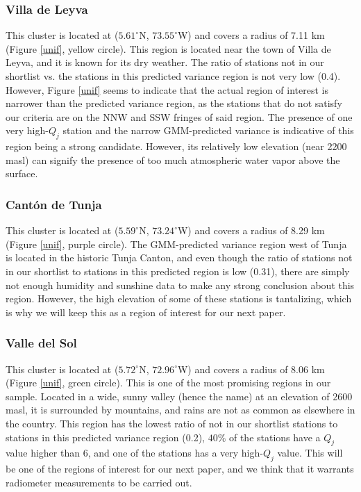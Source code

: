 \documentclass[12pt]{iopart}
\begin{document}
\subsubsection{Villa de Leyva}

This cluster is located at ($5.61^\circ$N, $73.55^\circ$W) and covers a radius of 7.11 km (Figure \ref{unif}, yellow circle). This region is located near the town of Villa de Leyva, and it is known for its dry weather.  The ratio of stations not in our shortlist vs. the stations in this predicted variance region is not very low (0.4). However, Figure \ref{unif} seems to indicate that the actual region of interest is narrower than the predicted variance region, as the stations that do not satisfy our criteria are on the NNW and SSW fringes of said region. The presence of one very high-$Q_j$ station and the narrow GMM-predicted variance is indicative of this region being a strong candidate. However, its relatively low elevation (near 2200 masl) can signify the presence of too much atmospheric water vapor above the surface. 


\subsubsection{Cant\'on de Tunja}

This cluster is located at ($5.59^\circ$N, $73.24^\circ$W) and covers a radius of 8.29 km (Figure \ref{unif}, purple circle). The GMM-predicted variance region west of Tunja is located in the historic Tunja Canton, and even though the ratio of stations not in our shortlist to stations in this predicted region is low (0.31), there are simply not enough humidity and sunshine data to make any strong conclusion about this region. However, the high elevation of some of these stations is tantalizing, which is why we will keep this as a region of interest for our next paper.



\subsubsection{Valle del Sol}

This cluster is located at ($5.72^\circ$N, $72.96^\circ$W) and covers a radius of 8.06 km (Figure \ref{unif}, green circle). This is one of the most promising regions in our sample. Located in a wide, sunny valley (hence the name) at an elevation of 2600 masl, it is surrounded by mountains, and rains are not as common as elsewhere in the country. This region has the lowest ratio of not in our shortlist stations to stations in this predicted variance region (0.2), $40\%$ of the stations have a $Q_j$ value higher than 6, and one of the stations has a very high-$Q_j$ value. This will be one of the regions of interest for our next paper, and we think that it warrants radiometer measurements to be carried out.
\end{document}
